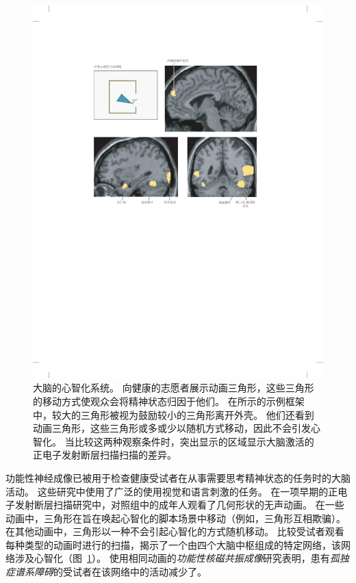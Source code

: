 \begin{figure}[htbp]
	\centering
	\includegraphics[width=0.95\linewidth]{chap62/fig_62_4}
	\caption{大脑的心智化系统。
		向健康的志愿者展示动画三角形，这些三角形的移动方式使观众会将精神状态归因于他们。
		在所示的示例框架中，较大的三角形被视为鼓励较小的三角形离开外壳。
		他们还看到动画三角形，这些三角形或多或少以随机方式移动，因此不会引发心智化。
		当比较这两种观察条件时，突出显示的区域显示大脑激活的正电子发射断层扫描扫描的差异\cite{castelli2002autism}。}
	\label{fig:62_4}
\end{figure}


功能性神经成像已被用于检查健康受试者在从事需要思考精神状态的任务时的大脑活动。
这些研究中使用了广泛的使用视觉和语言刺激的任务。
在一项早期的正电子发射断层扫描研究中，对照组中的成年人观看了几何形状的无声动画。
在一些动画中，三角形在旨在唤起心智化的脚本场景中移动（例如，三角形互相欺骗）。
在其他动画中，三角形以一种不会引起心智化的方式随机移动。
比较受试者观看每种类型的动画时进行的扫描，揭示了一个由四个大脑中枢组成的特定网络，该网络涉及心智化（图~\ref{fig:62_4}）。
使用相同动画的\textit{功能性核磁共振成像}研究表明，患有\textit{孤独症谱系障碍}的受试者在该网络中的活动减少了。


